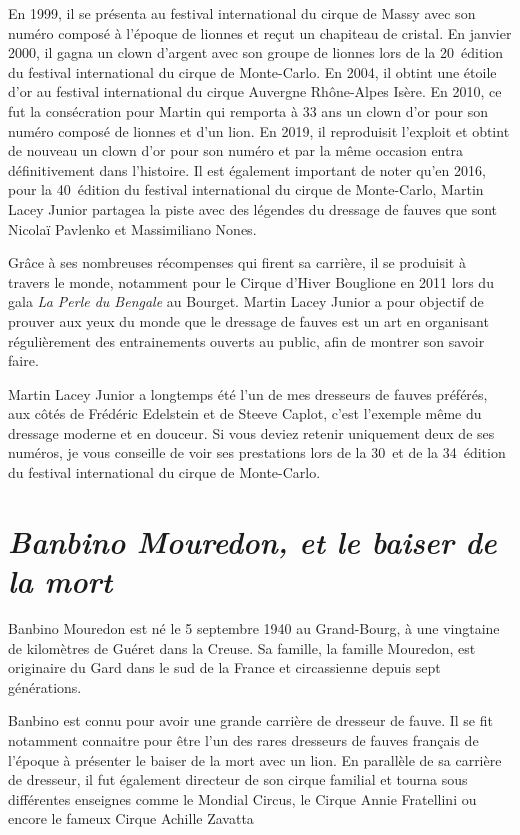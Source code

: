 En 1999, il se présenta au festival international du cirque de Massy avec son numéro composé à l'époque de lionnes et reçut un chapiteau de cristal. En janvier 2000, il gagna un clown d'argent avec son groupe de lionnes lors de la 20\ieme~édition du festival international du cirque de Monte-Carlo. En 2004, il obtint une étoile d'or au festival international du cirque Auvergne Rhône-Alpes Isère. En 2010, ce fut la consécration pour Martin qui remporta à 33 ans un clown d'or pour son numéro composé de lionnes et d’un lion. En 2019, il reproduisit l'exploit et obtint de nouveau un clown d'or pour son numéro et par la même occasion entra définitivement dans l'histoire. Il est également important de noter qu'en 2016, pour la 40\ieme~édition du festival international du cirque de Monte-Carlo, Martin Lacey Junior partagea la piste avec des légendes du dressage de fauves que sont Nicolaï Pavlenko et Massimiliano Nones.

Grâce à ses nombreuses récompenses qui firent sa carrière, il se produisit à travers le monde, notamment pour le Cirque d'Hiver Bouglione en 2011 lors du gala \textit{La Perle du Bengale} au Bourget. Martin Lacey Junior a pour objectif de prouver aux yeux du monde que le dressage de fauves est un art en organisant régulièrement des entrainements ouverts au public, afin de montrer son savoir faire.

Martin Lacey Junior a longtemps été l'un de mes dresseurs de fauves préférés, aux côtés de Frédéric Edelstein et de Steeve Caplot, c'est l'exemple même du dressage moderne et en douceur. Si vous deviez retenir uniquement deux de ses numéros, je vous conseille de voir ses prestations lors de la 30\ieme~et de la 34\ieme~édition du festival international du cirque de Monte-Carlo.

\section*{\textit{Banbino Mouredon, et le baiser de la mort}}
{}

Banbino Mouredon est né le 5 septembre 1940 au Grand-Bourg, à une vingtaine de kilomètres de Guéret dans la Creuse. Sa famille, la famille Mouredon, est originaire du Gard dans le sud de la France et circassienne depuis sept générations.

Banbino est connu pour avoir une grande carrière de dresseur de fauve. Il se fit notamment connaitre pour être l'un des rares dresseurs de fauves français de l'époque à présenter le baiser de la mort avec un lion. En parallèle de sa carrière de dresseur, il fut également directeur de son cirque familial et tourna sous différentes enseignes comme le Mondial Circus, le Cirque Annie Fratellini ou encore le fameux Cirque Achille Zavatta

